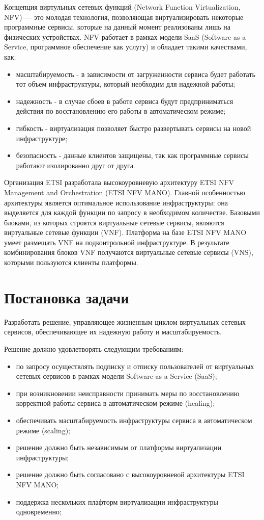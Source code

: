 \documentclass[oneside,final,14pt,a4paper]{extreport}
\begin{document}
Концепция виртульных сетевых функций (Network Function Virtualization, NFV) --- это молодая технология, позволяющая виртуализировать некоторые программные сервисы, которые на данный момент реализованы лишь на физических устройствах. NFV работает в рамках модели SaaS (Software as a Service, программное обеспечение как услугу) и обладает такими качествами, как:
\begin{itemize}
	\item масштабируемость - в зависимости от загруженности сервиса будет работать тот объем инфраструктуры, который необходим для надежной работы;
	\item надежность - в случае сбоев в работе сервиса будут предприниматься действия по восстановлению его работы в автоматическом режиме;
	\item гибкость - виртуализация позволяет быстро развертывать сервисы на новой инфраструктуре;
	\item безопасность - данные клиентов защищены, так как программные сервисы работают изолированно друг от друга.
\end{itemize}

Организация ETSI разработала высокоуровневую архитектуру ETSI NFV Management and Orchestration (ETSI NFV MANO). Главной особенностью архитектуры является оптимальное использование инфраструктуры: она выделяется для каждой функции по запросу в необходимом количестве. Базовыми блоками, из которых строятся виртуальные сетевые сервисы, являются виртуальные сетевые функции (VNF). Платформа на базе ETSI NFV MANO умеет размещать VNF на подконтрольной инфраструктуре. В результате комбинирования блоков VNF получаются виртуальные сетевые сервисы (VNS), которыми пользуются клиенты платформы.





\chapter{Постановка задачи}
Разработать решение, управляющее жизненным циклом виртуальных сетевых сервисов, обеспечивающее их надежную работу и масштабируемость.

Решение должно удовлетворять следующим требованиям:
\begin{itemize}
	\item по запросу осуществлять подписку и отписку пользователей от виртуальных сетевых сервисов в рамках модели Software as a Service (SaaS);
	\item при возникновении неисправности принимать меры по восстановлению корректной работы сервиса в автоматическом режиме (healing);
	\item обеспечивать масштабируемость инфраструктуры сервиса в автоматическом режиме (scaling);
	\item решение должно быть независимым от платформы виртуализации инфраструктуры;
	\item решение должно быть согласовано с высокоуровневой архитектуры ETSI NFV MANO;
	\item поддержка нескольких плафторм виртуализации инфраструктуры одновременно;
\end{itemize}
\end{document}
